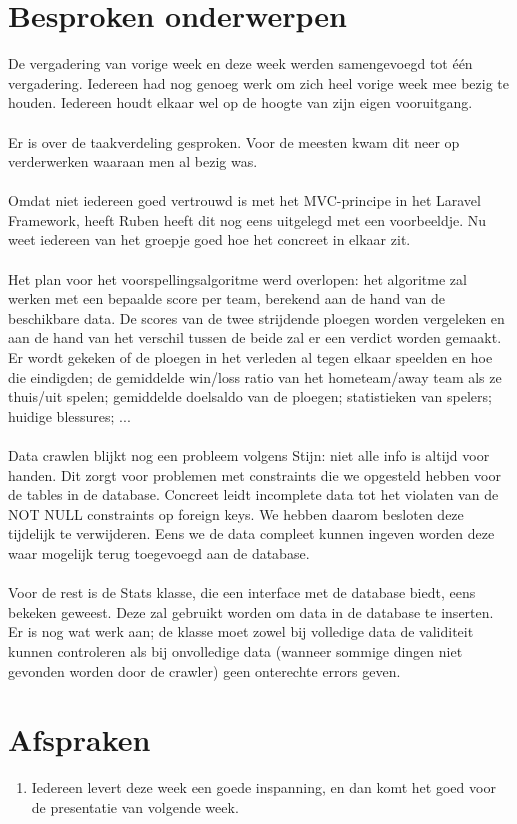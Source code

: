 \documentclass[11pt, a4paper]{article}
\begin{document}
\section{Besproken onderwerpen}
De vergadering van vorige week en deze week werden samengevoegd tot \'e\'en vergadering. Iedereen had nog genoeg werk om zich heel vorige week mee bezig te houden. Iedereen houdt elkaar wel op de hoogte van zijn eigen vooruitgang.
\\
\\
Er is over de taakverdeling gesproken. Voor de meesten kwam dit neer op verderwerken waaraan men al bezig was.
\\
\\
Omdat niet iedereen goed vertrouwd is met het MVC-principe in het Laravel Framework, heeft Ruben heeft dit nog eens uitgelegd met een voorbeeldje. Nu weet iedereen van het groepje goed hoe het concreet in elkaar zit.
\\
\\
Het plan voor het voorspellingsalgoritme werd overlopen: het algoritme zal werken met een bepaalde score per team, berekend aan de hand van de beschikbare data. De scores van de twee strijdende ploegen worden vergeleken  en aan de hand van het verschil tussen de beide zal er een verdict worden gemaakt. Er wordt gekeken of de ploegen in het verleden al tegen elkaar speelden en hoe die eindigden; de gemiddelde win/loss ratio van het hometeam/away team als ze thuis/uit spelen; gemiddelde doelsaldo van de ploegen; statistieken van spelers; huidige blessures; ...
\\
\\
Data crawlen blijkt nog een probleem volgens Stijn: niet alle info is altijd voor handen. Dit zorgt voor problemen met constraints die we opgesteld hebben voor de tables in de database. Concreet leidt incomplete data tot het violaten van de NOT NULL constraints op foreign keys. We hebben daarom besloten deze tijdelijk te verwijderen. Eens we de data compleet kunnen ingeven worden deze waar mogelijk terug toegevoegd aan de database. 
\\
\\
Voor de rest is de Stats klasse, die een interface met de database biedt, eens bekeken geweest. Deze zal gebruikt worden om data in de database te inserten. Er is nog wat werk aan; de klasse moet zowel bij volledige data de validiteit kunnen controleren als bij onvolledige data (wanneer sommige dingen niet gevonden worden door de crawler) geen onterechte errors geven.


\section{Afspraken}
\begin{enumerate}
\item Iedereen levert deze week een goede inspanning, en dan komt het goed voor de presentatie van volgende week.
\end{enumerate}
\end{document}
